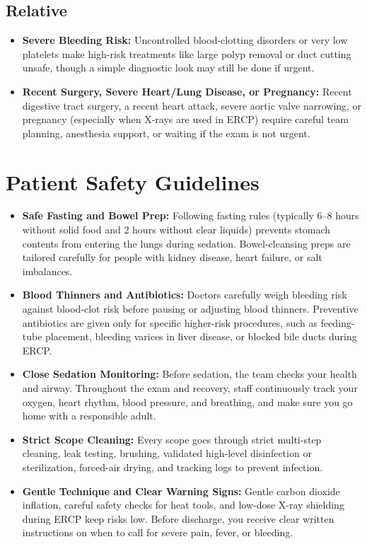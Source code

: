 \subsection{Relative}
\begin{itemize}
\item \textbf{Severe Bleeding Risk:} Uncontrolled blood-clotting disorders or very low platelets make high-risk treatments like large polyp removal or duct cutting unsafe, though a simple diagnostic look may still be done if urgent.
\item \textbf{Recent Surgery, Severe Heart/Lung Disease, or Pregnancy:} Recent digestive tract surgery, a recent heart attack, severe aortic valve narrowing, or pregnancy (especially when X-rays are used in ERCP) require careful team planning, anesthesia support, or waiting if the exam is not urgent.
\end{itemize}

\section{Patient Safety Guidelines}
\begin{itemize}
\item \textbf{Safe Fasting and Bowel Prep:} Following fasting rules (typically 6--8 hours without solid food and 2 hours without clear liquids) prevents stomach contents from entering the lungs during sedation. Bowel-cleansing preps are tailored carefully for people with kidney disease, heart failure, or salt imbalances.
\item \textbf{Blood Thinners and Antibiotics:} Doctors carefully weigh bleeding risk against blood-clot risk before pausing or adjusting blood thinners. Preventive antibiotics are given only for specific higher-risk procedures, such as feeding-tube placement, bleeding varices in liver disease, or blocked bile ducts during ERCP.
\item \textbf{Close Sedation Monitoring:} Before sedation, the team checks your health and airway. Throughout the exam and recovery, staff continuously track your oxygen, heart rhythm, blood pressure, and breathing, and make sure you go home with a responsible adult.
\item \textbf{Strict Scope Cleaning:} Every scope goes through strict multi-step cleaning, leak testing, brushing, validated high-level disinfection or sterilization, forced-air drying, and tracking logs to prevent infection.
\item \textbf{Gentle Technique and Clear Warning Signs:} Gentle carbon dioxide inflation, careful safety checks for heat tools, and low-dose X-ray shielding during ERCP keep risks low. Before discharge, you receive clear written instructions on when to call for severe pain, fever, or bleeding.
\end{itemize}

